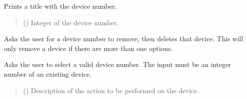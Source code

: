 \documentclass[letterpaper,10pt,english]{sphinxmanual}
\begin{document}
\begin{fulllineitems}
\begin{fulllineitems}
\label{\detokenize{Setup_PodInterface:Setup_PodInterface.Setup_Interface._PrintDeviceNumber}}
\pysigstartsignatures
{}
\pysigstopsignatures
\sphinxAtStartPar
Prints a title with the device number.
\begin{quote}\begin{description}
\sphinxAtStartPar
{} () \textendash{} Integer of the device number.

\end{description}\end{quote}

\end{fulllineitems}


\begin{fulllineitems}
\label{\detokenize{Setup_PodInterface:Setup_PodInterface.Setup_Interface._RemoveDevice}}
\pysigstartsignatures
{}
\pysigstopsignatures
\sphinxAtStartPar
Asks the user for a device number to remove, then deletes that device. This will         only remove a device if there are more than one options.

\end{fulllineitems}


\begin{fulllineitems}
\label{\detokenize{Setup_PodInterface:Setup_PodInterface.Setup_Interface._SelectDeviceFromDict}}
\pysigstartsignatures
{}
\pysigstopsignatures
\sphinxAtStartPar
Asks the user to select a valid device number. The input must be an integer number         of an existing device.
\begin{quote}\begin{description}
\sphinxAtStartPar
{} () \textendash{} Description of the action to be performed on the device.


\end{description}
\end{quote}
\end{fulllineitems}
\end{fulllineitems}
\end{document}

